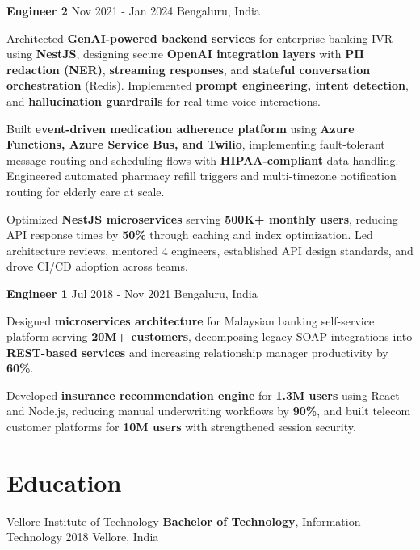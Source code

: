 \documentclass[letterpaper]{resume_config}
\begin{document}
\WorkExperience
    {\textbf{Engineer 2}}
    { }
    {Nov 2021 - Jan 2024}
    {Bengaluru, India}
    {
      \item[$\bullet$] Architected \textbf{GenAI-powered backend services} for enterprise banking IVR using \textbf{NestJS}, designing secure \textbf{OpenAI integration layers} with \textbf{PII redaction (NER)}, \textbf{streaming responses}, and \textbf{stateful conversation orchestration} (Redis). Implemented \textbf{prompt engineering, intent detection}, and \textbf{hallucination guardrails} for real-time voice interactions.
      \item[$\bullet$] Built \textbf{event-driven medication adherence platform} using \textbf{Azure Functions, Azure Service Bus, and Twilio}, implementing fault-tolerant message routing and scheduling flows with \textbf{HIPAA-compliant} data handling. Engineered automated pharmacy refill triggers and multi-timezone notification routing for elderly care at scale.
      \item[$\bullet$] Optimized \textbf{NestJS microservices} serving \textbf{500K+ monthly users}, reducing API response times by \textbf{50\%} through caching and index optimization. Led architecture reviews, mentored 4 engineers, established API design standards, and drove CI/CD adoption across teams.
    }

\WorkExperience
    {\textbf{Engineer 1}}
    {  }
    {Jul 2018 - Nov 2021}
    {Bengaluru, India}
    {
      \item[$\bullet$] Designed \textbf{microservices architecture} for Malaysian banking self-service platform serving \textbf{20M+ customers}, decomposing legacy SOAP integrations into \textbf{REST-based services} and increasing relationship manager productivity by \textbf{60\%}.
      \item[$\bullet$] Developed \textbf{insurance recommendation engine} for \textbf{1.3M users} using React and Node.js, reducing manual underwriting workflows by \textbf{90\%}, and built telecom customer platforms for \textbf{10M users} with strengthened session security.
    }

\section{\textcolor{NavyBlue}{Education}}

\EducationExperience
    {Vellore Institute of Technology}
    {\textbf{Bachelor of Technology}, Information Technology}
    {2018}
    {Vellore, India}
\end{document}

